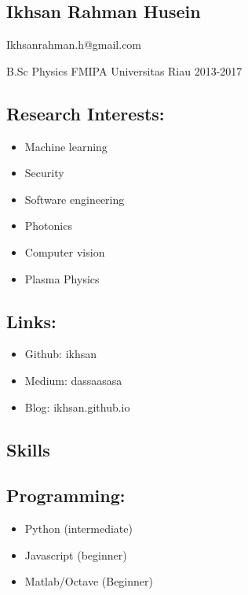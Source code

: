 \subsection{Ikhsan Rahman Husein}\label{ikhsan-rahman-husein}

Ikhsanrahman.h@gmail.com

B.Sc Physics FMIPA Universitas Riau 2013-2017

\subsection{Research Interests:}\label{research-interests}

\begin{itemize}
\tightlist
\item
  Machine learning
\item
  Security
\item
  Software engineering
\item
  Photonics
\item
  Computer vision
\item
  Plasma Physics
\end{itemize}

\subsection{Links:}\label{links}

\begin{itemize}
\tightlist
\item
  Github: ikhsan
\item
  Medium: dassaasasa
\item
  Blog: ikhsan.github.io
\end{itemize}

\subsection{Skills}\label{skills}

\subsection{Programming:}\label{programming}

\begin{itemize}
\tightlist
\item
  Python (intermediate)
\item
  Javascript (beginner)
\item
  Matlab/Octave (Beginner)
\end{itemize}

